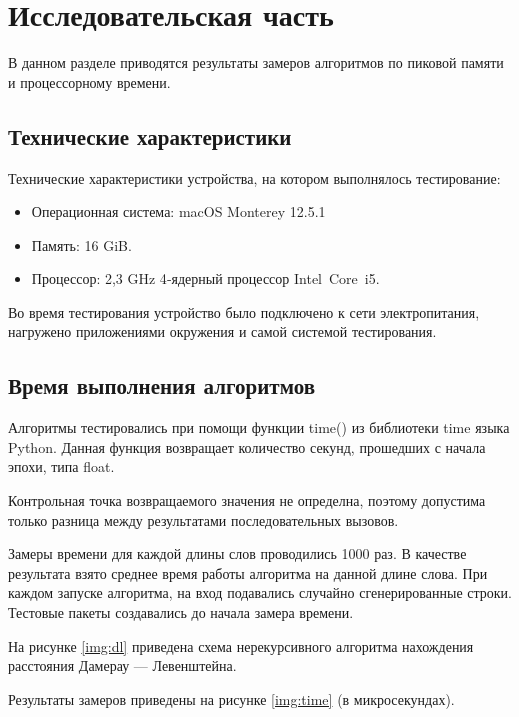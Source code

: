 \chapter{Исследовательская часть}

В данном разделе приводятся результаты замеров алгоритмов по пиковой памяти и процессорному времени.

\section{Технические характеристики}

Технические характеристики устройства, на котором выполнялось тестирование:

\begin{itemize}
	\item Операционная система: macOS Monterey 12.5.1 
	\item Память: 16 GiB.
	\item Процессор: 2,3 GHz 4‑ядерный процессор Intel Core i5.
\end{itemize}

Во время тестирования устройство было подключено к сети электропитания, нагружено приложениями окружения и самой  системой тестирования.

\section{Время выполнения алгоритмов}

Алгоритмы тестировались при помощи функции time() из библиотеки time языка Python. Данная функция возвращает количество секунд, прошедших с начала эпохи, типа float.

Контрольная точка возвращаемого значения не определна, поэтому допустима только разница между результатами последовательных вызовов.

Замеры времени для каждой длины слов проводились 1000 раз. В качестве результата взято среднее время работы алгоритма на данной длине слова. При каждом запуске алгоритма, на вход подавались случайно сгенерированные строки. Тестовые пакеты создавались до начала замера времени.

На рисунке \ref{img:dl} приведена схема нерекурсивного алгоритма нахождения расстояния Дамерау — Левенштейна.

Результаты замеров приведены на рисунке \ref{img:time} (в микросекундах).


